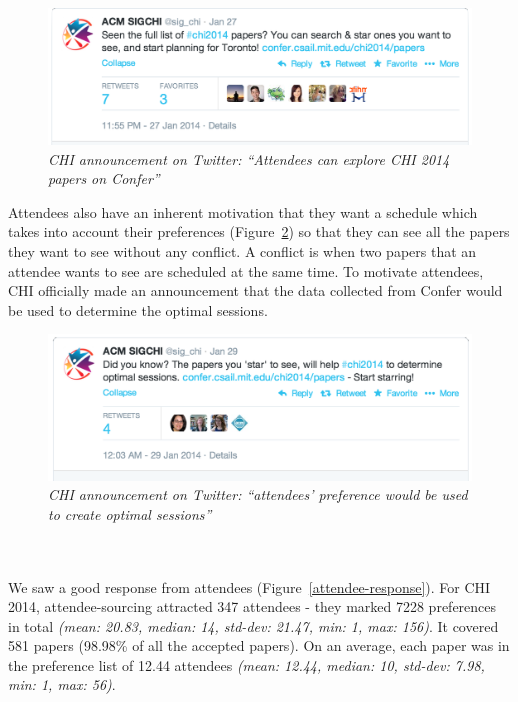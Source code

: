 \documentclass[letterpaper]{article}
\begin{document}
\begin{enumerate}[I]
\begin{figure}[!h]
\centering
\includegraphics[width=0.9\columnwidth]{chi-announcement-2.png}
\caption{\emph{CHI announcement on Twitter: ``Attendees can explore CHI 2014 papers on Confer''}}
\label{chi-announcement-2}
\end{figure}

Attendees also have an inherent motivation that they want a schedule which takes into account their preferences (Figure~\ref{chi-announcement-1}) so that they can see all the papers they want to see without any conflict. A conflict is when two papers that an attendee wants to see are scheduled at the same time. To motivate attendees, CHI officially made an announcement that the data collected from Confer would be used to determine the optimal sessions.
 

\begin{figure}[!h]
\centering
\includegraphics[width=0.9\columnwidth]{chi-announcement-1.png}
\caption{\emph{CHI announcement on Twitter: ``attendees' preference would be used to create optimal sessions''}}
\label{chi-announcement-1}
\end{figure}
\noindent
\\
\\
We saw a good response from attendees (Figure~\ref{attendee-response}). For CHI 2014, attendee-sourcing attracted 347 attendees - they marked 7228 preferences in total \emph{(mean: 20.83, median: 14, std-dev: 21.47, min: 1, max: 156)}. It covered 581 papers (98.98\% of all the accepted papers). On an average, each paper was in the preference list of 12.44 attendees \emph{(mean: 12.44, median: 10, std-dev: 7.98, min: 1, max: 56)}.



\end{enumerate}
\end{document}
